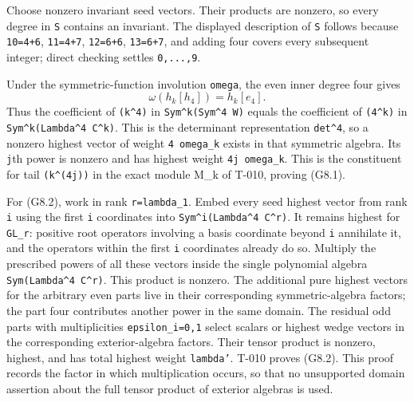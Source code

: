 \documentclass[
  10pt,
]{article}
\begin{document}
Choose nonzero invariant seed vectors. Their products are nonzero, so
every degree in \texttt{\small S} contains an invariant. The displayed
description of \texttt{\small S} follows because
\texttt{\small 10=\allowbreak{}4+\allowbreak{}6},
\texttt{\small 11=\allowbreak{}4+\allowbreak{}7},
\texttt{\small 12=\allowbreak{}6+\allowbreak{}6},
\texttt{\small 13=\allowbreak{}6+\allowbreak{}7}, and adding four covers
every subsequent integer; direct checking settles
\texttt{\small 0,\allowbreak{}...,\allowbreak{}9}.

Under the symmetric-function involution \texttt{\small omega}, the even
inner degree four gives \[
\omega(h_k[h_4])=h_k[e_4].
\tag{G8.5}
\] Thus the coefficient of
\texttt{\small (\allowbreak{}k\textasciicircum{}4)\allowbreak{}} in
\texttt{\small Sym\textasciicircum{}k(\allowbreak{}Sym\textasciicircum{}4 W)\allowbreak{}}
equals the coefficient of
\texttt{\small (\allowbreak{}4\textasciicircum{}k)\allowbreak{}} in
\texttt{\small Sym\textasciicircum{}k(\allowbreak{}Lambda\textasciicircum{}4 C\textasciicircum{}k)\allowbreak{}}.
This is the determinant representation
\texttt{\small det\textasciicircum{}4}, so a nonzero highest vector of
weight \texttt{\small 4 omega\_\allowbreak{}k} exists in that symmetric
algebra. Its \texttt{\small j}th power is nonzero and has highest weight
\texttt{\small 4j omega\_\allowbreak{}k}. This is the constituent for
tail
\texttt{\small (\allowbreak{}k\textasciicircum{}(\allowbreak{}4j)\allowbreak{})\allowbreak{}}
in the exact module M\_k of T-010, proving (G8.1).

For (G8.2), work in rank
\texttt{\small r=\allowbreak{}lambda\_\allowbreak{}1}. Embed every seed
highest vector from rank \texttt{\small i} using the first
\texttt{\small i} coordinates into
\texttt{\small Sym\textasciicircum{}i(\allowbreak{}Lambda\textasciicircum{}4 C\textasciicircum{}r)\allowbreak{}}.
It remains highest for \texttt{\small GL\_\allowbreak{}r}: positive root
operators involving a basis coordinate beyond \texttt{\small i}
annihilate it, and the operators within the first \texttt{\small i}
coordinates already do so. Multiply the prescribed powers of all these
vectors inside the single polynomial algebra
\texttt{\small Sym(\allowbreak{}Lambda\textasciicircum{}4 C\textasciicircum{}r)\allowbreak{}}.
This product is nonzero. The additional pure highest vectors for the
arbitrary even parts live in their corresponding symmetric-algebra
factors; the part four contributes another power in the same domain. The
residual odd parts with multiplicities
\texttt{\small epsilon\_\allowbreak{}i=\allowbreak{}0,\allowbreak{}1}
select scalars or highest wedge vectors in the corresponding
exterior-algebra factors. Their tensor product is nonzero, highest, and
has total highest weight \texttt{\small lambda'}. T-010 proves (G8.2).
This proof records the factor in which multiplication occurs, so that no
unsupported domain assertion about the full tensor product of exterior
algebras is used.
\end{document}
